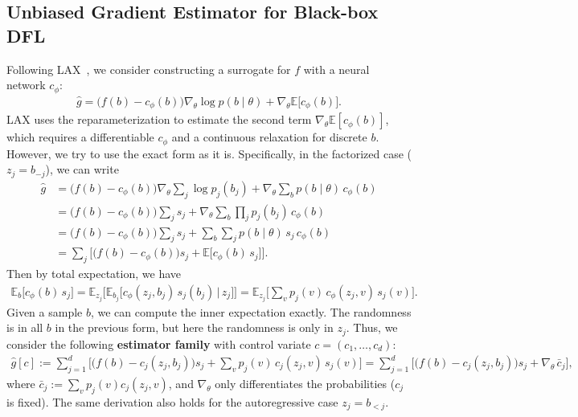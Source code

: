 \documentclass[10pt]{article}
\providecommand{\E}{\mathbb{E}}
\theoremstyle{plain}
\theoremstyle{definition}
\theoremstyle{remark}
\theoremstyle{definition}
\newcommand{\ctx}[1]{z_{#1}}                 %
\newcommand{\score}[1]{s_{#1}}               %
\newcommand{\ghat}[1]{\hat g[#1]}            %
\newcommand{\pj}[1]{p_{#1}}                  %
\begin{document}
\subsection{Unbiased Gradient Estimator for Black-box DFL}\label{sec:family}
Following LAX~\cite{GCW+18}, we consider constructing a surrogate for $f$ with a neural network $c_\phi$:
\begin{align}
    \hat{g} = \big(f(b) - c_\phi(b)\big)\nabla_\theta\log p(b\mid\theta) + \nabla_\theta\E\big[c_\phi(b)\big].
\end{align}
LAX uses the reparameterization to estimate the second term $\nabla_\theta\E[c_\phi(b)]$, which requires a differentiable $c_\phi$ and a continuous relaxation for discrete $b$. However, we try to use the exact form as it is. Specifically, in the factorized case ($\ctx{j}=b_{-j}$), we can write
\begin{align}
    \hat{g} &= \big(f(b) - c_\phi(b)\big)\nabla_\theta\sum_j\log\pj{j}(b_j) + \nabla_\theta\sum_{b}p(b\mid\theta)\,c_\phi(b) \\
    &= \big(f(b) - c_\phi(b)\big)\sum_j\score{j} + \nabla_\theta\sum_{b}\prod_j\pj{j}(b_j)\,c_\phi(b) \\
    &= \big(f(b) - c_\phi(b)\big)\sum_j\score{j} + \sum_{b}\sum_j p(b\mid\theta)\,\score{j}\,c_\phi(b) \\
    &= \sum_j\Big[\big(f(b) - c_\phi(b)\big)\score{j} + \E\big[c_\phi(b)\,\score{j}\big]\Big].
\end{align}
Then by total expectation, we have
\begin{align}
    \E_b\big[c_\phi(b)\,\score{j}\big] = \E_{\ctx{j}}\Big[\E_{b_j}\big[c_\phi(\ctx{j},b_j)\,\score{j}(b_j)\,\big|\,\ctx{j}\big]\Big]
    = \E_{\ctx{j}}\Big[\sum_v\pj{j}(v)\,c_\phi(\ctx{j},v)\,\score{j}(v)\Big].
\end{align}
Given a sample $b$, we can compute the inner expectation exactly. The randomness is in all $b$ in the previous form, but here the randomness is only in $\ctx{j}$. Thus, we consider the following \textbf{estimator family} with control variate $c=(c_1,\dots,c_d)$:
\begin{align}\label{eq:family}
    \ghat{c} :=\sum_{j=1}^{d}\Big[\big(f(b) - c_j(\ctx{j},b_j)\big)\score{j} + \sum_v\pj{j}(v)\,c_j(\ctx{j},v)\,\score{j}(v)\Big]
    =\sum_{j=1}^{d}\Big[\big(f(b) - c_j(\ctx{j},b_j)\big)\score{j} + \nabla_\theta\,\bar c_j\Big],
\end{align}
where $\bar c_j:=\sum_v\pj{j}(v)c_j(\ctx{j},v)$, and $\nabla_\theta$ only differentiates the probabilities ($c_j$ is fixed). The same derivation also holds for the autoregressive case $\ctx{j}=b_{<j}$.
\end{document}
